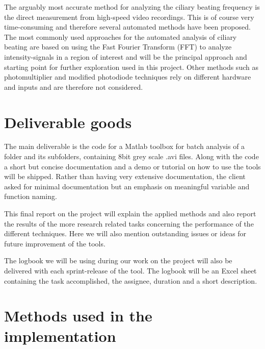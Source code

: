\documentclass[11pt]{scrartcl}
\begin{document}
The arguably most accurate method for analyzing the ciliary beating frequency is the direct measurement from
high-speed video recordings. This is of course very time-consuming and therefore several automated methods
have been proposed. The most commonly used approaches for the automated analysis of ciliary beating are based
on using the Fast Fourier Transform (FFT) to analyze intensity-signals in a region of interest and will be the
principal approach and starting point for further exploration used in this project. Other methods such as
photomultiplier and modified photodiode techniques rely on different hardware and inputs and are therefore not
considered.


\section{Deliverable goods}

The main deliverable is the code for a Matlab toolbox for batch analysis of a folder and its subfolders,
containing 8bit grey scale .avi files.  Along with the code a short but concise documentation and a demo or
tutorial on how to use the tools will be shipped. Rather than having very extensive documentation, the client
asked for minimal documentation but an emphasis on meaningful variable and function naming.

This final report on the project will explain the applied methods and also report the results of the more
research related tasks concerning the performance of the different techniques. Here we will also mention
outstanding issues or ideas for future improvement of the tools.

The logbook we will be using during our work on the project will also be delivered with each sprint-release of
the tool. The logbook will be an Excel sheet containing the task accomplished, the assignee, duration and a
short description.



\section{Methods used in the implementation}
\end{document}
